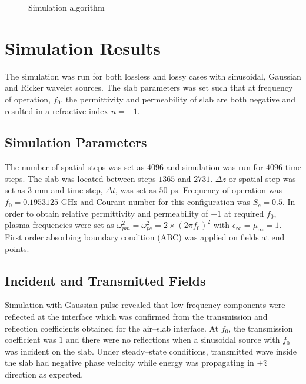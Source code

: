 \begin{figure}[htbp]
\caption{Simulation algorithm}
\label{1D-DNG-Algorithm}
\end{figure}
\section{Simulation Results}
The simulation was run for both lossless and lossy cases with sinusoidal, Gaussian and Ricker wavelet sources. The slab parameters was set such that at frequency of operation, $f_0$, the permittivity and permeability of slab are both negative and resulted in a refractive index $n=-1$.
\subsection{Simulation Parameters}
The number of spatial steps was set as $4096$ and simulation was run for $4096$ time steps. The slab was located between steps $1365$ and $2731$. $\Delta z$ or spatial step was set as $3$ mm and time step, $\Delta t$, was set as $50$ ps. Frequency of operation was $f_0=0.1953125$ GHz and Courant number for this configuration was $S_c=0.5$. In order to obtain relative permittivity and permeability of $-1$ at required $f_0$, plasma frequencies were set as $\omega^2_{pm}=\omega^2_{pe}=2\times(2\pi f_0)^2$ with $\epsilon_\infty=\mu_\infty=1$. First order absorbing boundary condition (ABC) was applied on fields at end points.
\subsection{Incident and Transmitted Fields}
Simulation with Gaussian pulse revealed that low frequency components were reflected at the interface which was confirmed from the transmission and reflection coefficients obtained for the air--slab interface. At $f_0$, the transmission coefficient was $1$ and there were no reflections when a sinusoidal source with $f_0$ was incident on the slab. Under steady--state conditions, transmitted wave inside the slab had negative phase velocity while energy was propagating in $+\hat{z}$ direction as expected.
